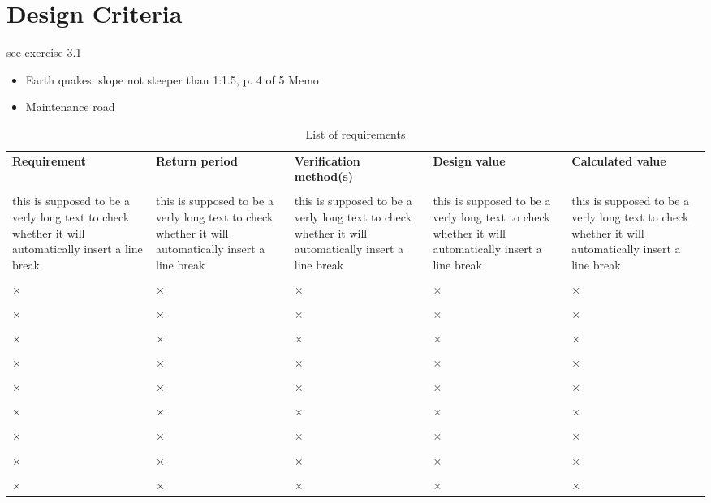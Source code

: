 \chapter{Design Criteria}

see exercise 3.1
\begin{itemize}
 \item Earth quakes: slope not steeper than 1:1.5, p. 4 of 5 Memo
 \item Maintenance road
\end{itemize}


\begin{center}
\begin{table}[!htb]
\begin{tabu}{X[2l] X[1c] X[2c] X[1c] X[1c]}
\textbf{Requirement} & \textbf{Return period} & \textbf{Verification method(s)} & \textbf{Design value} & \textbf{Calculated value}\\
\\
\toprule[2pt]
this is supposed to be a verly long text to check whether it will automatically insert a line break & this is supposed to be a verly long text to check whether it will automatically insert a line break & this is supposed to be a verly long text to check whether it will automatically insert a line break & this is supposed to be a verly long text to check whether it will automatically insert a line break & this is supposed to be a verly long text to check whether it will automatically insert a line break\\
\\
× & × & × & × & ×\\
\\
× & × & × & × & ×\\
\\
× & × & × & × & ×\\
\\
× & × & × & × & ×\\
\\
× & × & × & × & ×\\
\\
× & × & × & × & ×\\
\\
× & × & × & × & ×\\
\\
× & × & × & × & ×\\
\\
× & × & × & × & ×\\
\bottomrule[2pt]
\end{tabu}
\caption{List of requirements}
\label{tab:requirements}
\end{table}
\end{center}
